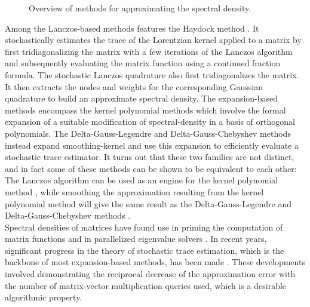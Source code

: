 \begin{figure}[ht]
    \centering
    
    \caption{Overview of methods for approximating the spectral density.}
    \label{fig:1-introduction-literature-overview}
\end{figure}

Among the Lanczos-based methods features the Haydock method \cite{haydock1972electronic, lin2016review}.
It stochastically estimates the trace of the Lorentzian kernel applied to a matrix
by first tridiagonalizing the matrix with a few iterations of the Lanczos algorithm
\cite{lanczos1950iteration} and subsequently evaluating the matrix function using
a continued fraction formula. The stochastic Lanczos quadrature \cite{lin2016review, ubaru2017lanczos,chen2021slq}
also first tridiagonalizes the matrix. It then extracts the nodes and weights
for the corresponding Gaussian quadrature to build an approximate spectral density.
The expansion-based methods encompass the kernel polynomial methods \cite{silver1994kpm, wang1994kpm, weisse2006kpm}
which involve the formal expansion of a suitable modification of \gls{spectral-density}
in a basis of orthogonal polynomials. The Delta-Gauss-Legendre \cite{lin2016review}
and Delta-Gauss-Chebyshev \cite{lin2017randomized} methods instead expand \gls{smoothing-kernel}
and use this expansion to efficiently evaluate a stochastic trace estimator.
It turns out that these two families are not distinct, and in fact some of these
methods can be shown to be equivalent to each other: The Lanczos algorithm
can be used as an engine for the kernel polynomial method \cite{chen2023kpm},
while smoothing the approximation resulting from the kernel polynomial method 
will give the same result as the Delta-Gauss-Legendre and Delta-Gauss-Chebyshev
methods \cite{lin2016review}.\\ 

Spectral densities of matrices have found use in priming the computation of matrix
functions \cite{fan2020spectrum} and in parallelized eigenvalue solvers
\cite{polizzi2009density, li2019slicing}. In recent years, significant progress
in the theory of stochastic trace estimation, which is the backbone of most
expansion-based methods, has been made \cite{meyer2021hutch, persson2022hutch}.
These developments involved demonstrating the reciprocal decrease
of the approximation error with the number of matrix-vector multiplication
queries used, which is a desirable algorithmic property.


